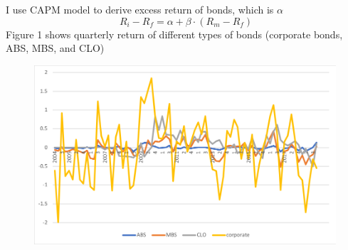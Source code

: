 \documentclass{article}
\begin{document}
I use CAPM model to derive excess return of bonds, which is $\alpha$
\begin{equation} 
\ R_i-R_f=\alpha+\beta\cdot (R_m-R_f)
\end{equation}
Figure 1 shows quarterly return of different types of bonds (corporate bonds, ABS, MBS, and CLO)
\begin{figure}[h]
\centering
\includegraphics[scale=0.5]{picture1.png}
\end{figure}

 
\end{document}

